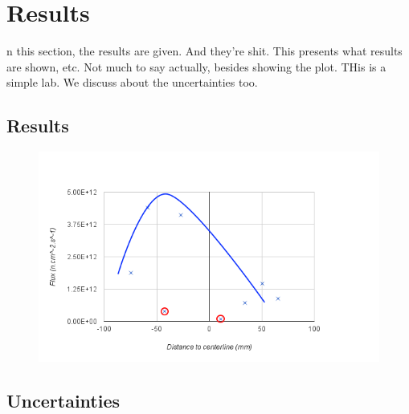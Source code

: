 %
%
\let\textcircled=\pgftextcircled
\chapter{Results}
\label{chap:result}

n this section, the results are given. And they're shit. This presents what results are shown, etc. Not much to say actually, besides showing the plot. THis is a simple lab. We discuss about the uncertainties too.

\section{Results}

\begin{figure}[t!]
	\centering
	\includegraphics[height=0.4\textheight]{fig02/flux2.png}
	\label{fig:flux2}
\end{figure}

\section{Uncertainties}


